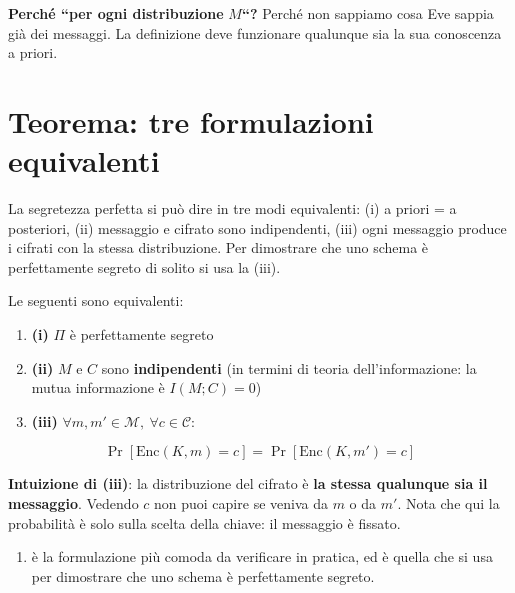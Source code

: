 \begin{nota}

\textbf{Perché ``per ogni distribuzione} \(M\)\textbf{``?} Perché non sappiamo cosa Eve sappia già dei messaggi. La definizione deve funzionare qualunque sia la sua conoscenza a priori.

\end{nota}

\section{Teorema: tre formulazioni equivalenti}

\begin{inbreve}

La segretezza perfetta si può dire in tre modi equivalenti: (i) a priori = a posteriori, (ii) messaggio e cifrato sono indipendenti, (iii) ogni messaggio produce i cifrati con la stessa distribuzione. Per dimostrare che uno schema è perfettamente segreto di solito si usa la (iii).

\end{inbreve}

Le seguenti sono equivalenti:

\begin{enumerate}
\def\labelenumi{\arabic{enumi}.}
\tightlist
\item
  \textbf{(i)} \(\Pi\) è perfettamente segreto
\item
  \textbf{(ii)} \(M\) e \(C\) sono \textbf{indipendenti} (in termini di teoria dell'informazione: la mutua informazione è \(I(M; C) = 0\))
\item
  \textbf{(iii)} \(\forall m, m' \in \mathcal{M},\ \forall c \in \mathcal{C}\):
\end{enumerate}

\[
\Pr[\text{Enc}(K, m) = c] = \Pr[\text{Enc}(K, m') = c]
\]

\textbf{Intuizione di (iii)}: la distribuzione del cifrato è \textbf{la stessa qualunque sia il messaggio}. Vedendo \(c\) non puoi capire se veniva da \(m\) o da \(m'\). Nota che qui la probabilità è solo sulla scelta della chiave: il messaggio è fissato.

\begin{enumerate}
\def\labelenumi{(\roman{enumi})}
\setcounter{enumi}{2}
\tightlist
\item
  è la formulazione più comoda da verificare in pratica, ed è quella che si usa per dimostrare che uno schema è perfettamente segreto.
\end{enumerate}

